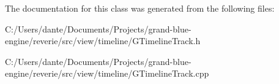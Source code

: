 The documentation for this class was generated from the following files\+:\begin{DoxyCompactItemize}
\item 
C\+:/\+Users/dante/\+Documents/\+Projects/grand-\/blue-\/engine/reverie/src/view/timeline/G\+Timeline\+Track.\+h\item 
C\+:/\+Users/dante/\+Documents/\+Projects/grand-\/blue-\/engine/reverie/src/view/timeline/G\+Timeline\+Track.\+cpp\end{DoxyCompactItemize}
